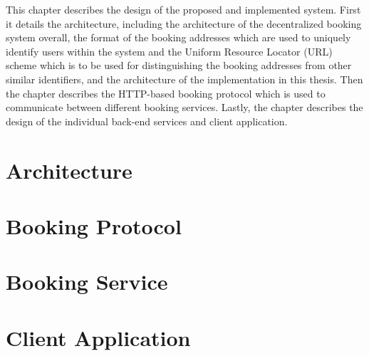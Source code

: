 This chapter describes the design of the proposed and implemented system. First it details the architecture, including the architecture of the decentralized booking system overall, the format of the booking addresses which are used to uniquely identify users within the system and the Uniform Resource Locator (URL) scheme which is to be used for distinguishing the booking addresses from other similar identifiers, and the architecture of the implementation in this thesis. Then the chapter describes the HTTP-based booking protocol which is used to communicate between different booking services. Lastly, the chapter describes the design of the individual back-end services and client application.

\section{Architecture}
\label{part:architecture}



\section{Booking Protocol}
\label{part:booking_protocol}



\section{Booking Service}
\label{part:booking_service}



\section{Client Application}
\label{part:client_application}


